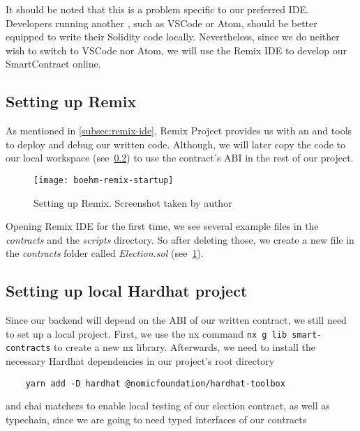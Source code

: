 It should be noted that this is a problem specific to our preferred \gls{IDE}.
Developers running another , such as VSCode or Atom, should be better equipped to write their Solidity code locally.
Nevertheless, since we do neither wish to switch to VSCode nor Atom, we will use the Remix \gls{IDE} to develop our \gls{SmartContract} online.

\subsection{Setting up Remix}\label{subsec:setting-up-remix}

As mentioned in \cref{subsec:remix-ide}, Remix Project provides us with an  and tools to deploy and debug our written code.
Although, we will later copy the code to our local workspace (see~\cref{subsec:setting-up-local-hardhat-project}) to use the contract's \gls{ABI} in the rest of our project.

\begin{figure}[h]
    \centering
    \texttt{[image: boehm-remix-startup]}
    \caption[Setting up Remix]{Setting up Remix. Screenshot taken by author}
    \label{fig:remix-setup}
\end{figure}

Opening Remix \gls{IDE} for the first time, we see several example files in the \emph{contracts} and the \emph{scripts} directory.
So after deleting those, we create a new file in the \emph{contracts} folder called \emph{Election.sol} (see~\cref{fig:remix-setup}).

\subsection{Setting up local Hardhat project}\label{subsec:setting-up-local-hardhat-project}

Since our backend will depend on the \gls{ABI} of our written contract, we still need to set up a local project.
First, we use the nx command \texttt{nx g lib smart-contracts} to create a new nx library.
Afterwards, we need to install the necessary Hardhat dependencies in our project's root directory

\begin{verbatim}
    yarn add -D hardhat @nomicfoundation/hardhat-toolbox
\end{verbatim}

and chai matchers to enable local testing of our election contract, as well as typechain, since we are going to need typed interfaces of our contracts

